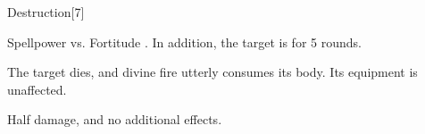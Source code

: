 \begin{spellsection}{Destruction}[7]
    \begin{spellheader}
    \end{spellheader}
    \begin{spellcontent}
        \begin{spelltargetinginfo}
        \end{spelltargetinginfo}
        \begin{spelleffects}
            \begin{spellattack}{Spellpower vs. Fortitude}
                \spellsuccess {}. In addition, the target is \staggered for 5 rounds.

                \spellcritical The target dies, and divine fire utterly consumes its body. Its equipment is unaffected.

                \spellfailure Half damage, and no additional effects.
            \end{spellattack}
        \end{spelleffects}
    \end{spellcontent}
    \begin{spellfooter}
        \miscastrandom
    \end{spellfooter}
\end{spellsection}

